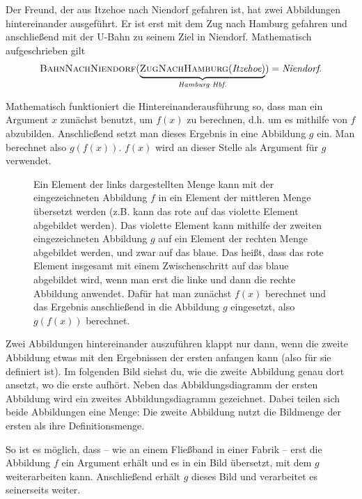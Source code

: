 \documentclass[../../main.tex]{subfiles}
\begin{document}
\begin{example}{}
    Der Freund, der aus Itzehoe nach Niendorf gefahren ist, hat zwei Abbildungen hintereinander ausgeführt. Er ist erst mit dem Zug nach Hamburg gefahren und anschließend mit der U-Bahn zu seinem Ziel in Niendorf. Mathematisch aufgeschrieben gilt \[\textsc{BahnNachNiendorf}(\underbrace{\textsc{ZugNachHamburg}(\emph{Itzehoe})}_{\emph{Hamburg Hbf.}})=\emph{Niendorf}.\]
\end{example}

Mathematisch funktioniert die Hintereinanderausführung so, dass man ein Argument $x$ zunächst benutzt, um $f(x)$ zu berechnen, d.h. um es mithilfe von $f$ abzubilden. Anschließend setzt man dieses Ergebnis in eine Abbildung $g$ ein. Man berechnet also $g(f(x))$. $f(x)$ wird an dieser Stelle als Argument für $g$ verwendet.

\begin{figure}[h!]
    \centering
    
    \caption{Ein Element der links dargestellten Menge kann mit der eingezeichneten Abbildung $f$ in ein Element der mittleren Menge übersetzt werden (z.B. kann das rote auf das violette Element abgebildet werden). Das violette Element kann mithilfe der zweiten eingezeichneten Abbildung $g$ auf ein Element der rechten Menge abgebildet werden, und zwar auf das blaue. Das heißt, dass das rote Element insgesamt mit einem Zwischenschritt auf das blaue abgebildet wird, wenn man erst die linke und dann die rechte Abbildung anwendet. Dafür hat man zunächst $f(x)$ berechnet und das Ergebnis anschließend in die Abbildung $g$ eingesetzt, also $g(f(x))$ berechnet.}
\end{figure}

Zwei Abbildungen hintereinander auszuführen klappt nur dann, wenn die zweite Abbildung etwas mit den Ergebnissen der ersten anfangen kann (also für sie definiert ist). Im folgenden Bild siehst du, wie die zweite Abbildung genau dort ansetzt, wo die erste aufhört. Neben das Abbildungsdiagramm der ersten Abbildung wird ein zweites Abbildungsdiagramm gezeichnet. Dabei teilen sich beide Abbildungen eine Menge: Die zweite Abbildung nutzt die Bildmenge der ersten als ihre Definitionsmenge.

So ist es möglich, dass -- wie an einem Fließband in einer Fabrik -- erst die Abbildung $f$ ein Argument erhält und es in ein Bild übersetzt, mit dem $g$ weiterarbeiten kann. Anschließend erhält $g$ dieses Bild und verarbeitet es seinerseits weiter.
\end{document}
